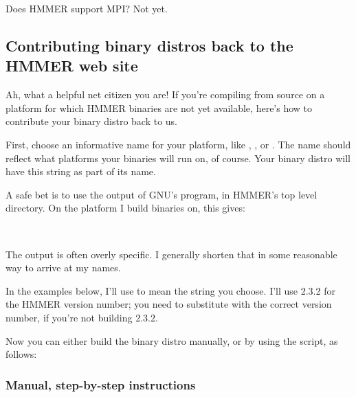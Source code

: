 \begin{srefaq}{Does HMMER support MPI?}
Not yet.
\end{srefaq}


\subsection{Contributing binary distros back to the HMMER web site}

Ah, what a helpful net citizen you are! If you're compiling from
source on a platform for which HMMER binaries are not yet available,
here's how to contribute your binary distro back to us.

First, choose an informative name for your platform, like
, , or
. The name should reflect what platforms your
binaries will run on, of course.  Your binary distro will have this
string as part of its name.

A safe bet is to use the output of GNU's  program, in
HMMER's top level directory. On the platform I build 
binaries on, this gives:

\\

The  output is often overly specific. I generally
shorten that in some reasonable way to arrive at my names.

In the examples below, I'll use  to mean the string
you choose. I'll use 2.3.2 for the HMMER version number; you need to
substitute with the correct version number, if you're not building
2.3.2.

Now you can either build the binary distro manually, or by using the
 script, as follows:

\subsubsection{Manual, step-by-step instructions}

